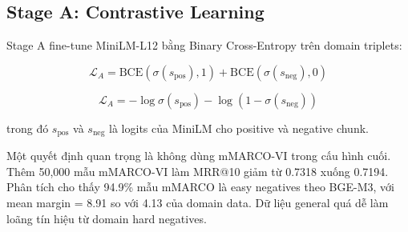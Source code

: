 \documentclass[../DoAn.tex]{subfiles}
\begin{document}
\begin{table}[H]
    \centering
    \caption{Tổng quan dataset huấn luyện reranker}
    \label{tab:reranker-training-data}
    {\small
    \setlength{\tabcolsep}{5pt}
    }
\end{table}

\subsection{Stage A: Contrastive Learning}
\label{subsection:4.2.3}

Stage A fine-tune MiniLM-L12 bằng Binary Cross-Entropy trên domain triplets:

\[
\mathcal{L}_A
=
\text{BCE}(\sigma(s_{\text{pos}}),1)
+
\text{BCE}(\sigma(s_{\text{neg}}),0)
\]

\[
\mathcal{L}_A
=
-\log\sigma(s_{\text{pos}})
-
\log\left(1-\sigma(s_{\text{neg}})\right)
\]

trong đó $s_{\text{pos}}$ và $s_{\text{neg}}$ là logits của MiniLM cho positive và negative chunk.

Một quyết định quan trọng là không dùng mMARCO-VI trong cấu hình cuối. Thêm 50,000 mẫu mMARCO-VI làm MRR@10 giảm từ 0.7318 xuống 0.7194. Phân tích cho thấy 94.9\% mẫu mMARCO là easy negatives theo BGE-M3, với mean margin = 8.91 so với 4.13 của domain data. Dữ liệu general quá dễ làm loãng tín hiệu từ domain hard negatives.
\end{document}
